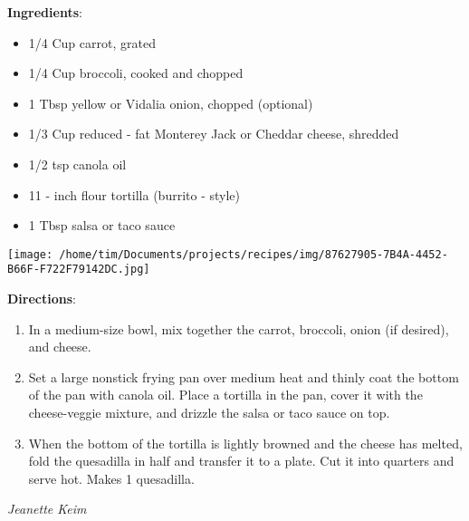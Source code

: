 \documentclass[11pt, twoside, openany]{book}
\begin{document}
\begin{minipage}[t]{0.8\linewidth}
\textbf{Ingredients}:\vspace{-3mm}
\begin{multicols}{2}
\begin{itemize}\setlength\itemsep{-1mm}
\item 1/4 Cup carrot, grated
\item 1/4 Cup broccoli, cooked and chopped
\item 1 Tbsp yellow or Vidalia onion, chopped (optional)
\item 1/3 Cup reduced - fat Monterey Jack or Cheddar cheese, shredded
\item 1/2 tsp canola oil
\item 11 - inch flour tortilla (burrito - style)
\item 1 Tbsp salsa or taco sauce
\end{itemize}
\end{multicols}
\end{minipage}
\begin{minipage}[t]{0.2\linewidth}
\centering \strut\vspace*{-\baselineskip}\newline
\texttt{[image: /home/tim/Documents/projects/recipes/img/87627905-7B4A-4452-B66F-F722F79142DC.jpg]}\\
\end{minipage}\vspace{3mm}
\textbf{Directions}:
\vspace{-3mm}\begin{enumerate}\setlength\itemsep{-1mm}
\item In a medium-size bowl, mix together the carrot, broccoli, onion (if desired), and cheese.
\item Set a large nonstick frying pan over medium heat and thinly coat the bottom of the pan with canola oil. Place a tortilla in the pan, cover it with the cheese-veggie mixture, and drizzle the salsa or taco sauce on top.
\item When the bottom of the tortilla is lightly browned and the cheese has melted, fold the quesadilla in half and transfer it to a plate. Cut it into quarters and serve hot. Makes 1 quesadilla.
\end{enumerate}
 \label{torte}\hfill\textit{Jeanette Keim}\\
\end{document}
